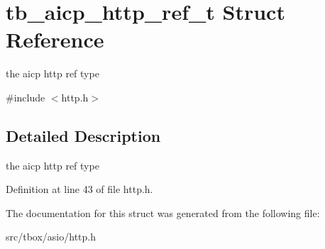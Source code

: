 \hypertarget{structtb__aicp__http__ref__t}{\section{tb\-\_\-aicp\-\_\-http\-\_\-ref\-\_\-t Struct Reference}
\label{structtb__aicp__http__ref__t}
}


the aicp http ref type  




{\ttfamily \#include $<$http.\-h$>$}



\subsection{Detailed Description}
the aicp http ref type 

Definition at line 43 of file http.\-h.



The documentation for this struct was generated from the following file\-:\begin{DoxyCompactItemize}
\item 
src/tbox/asio/http.\-h\end{DoxyCompactItemize}
